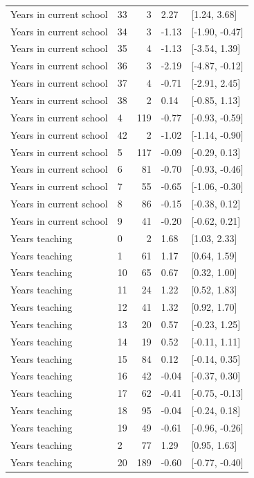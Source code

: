 \begin{tabular}{llrll}
Years in current school & 33 & 3 & 2.27 & {}[1.24, 3.68]\\
\addlinespace
Years in current school & 34 & 3 & -1.13 & {}[-1.90, -0.47]\\
Years in current school & 35 & 4 & -1.13 & {}[-3.54, 1.39]\\
Years in current school & 36 & 3 & -2.19 & {}[-4.87, -0.12]\\
Years in current school & 37 & 4 & -0.71 & {}[-2.91, 2.45]\\
Years in current school & 38 & 2 & 0.14 & {}[-0.85, 1.13]\\
\addlinespace
Years in current school & 4 & 119 & -0.77 & {}[-0.93, -0.59]\\
Years in current school & 42 & 2 & -1.02 & {}[-1.14, -0.90]\\
Years in current school & 5 & 117 & -0.09 & {}[-0.29, 0.13]\\
Years in current school & 6 & 81 & -0.70 & {}[-0.93, -0.46]\\
Years in current school & 7 & 55 & -0.65 & {}[-1.06, -0.30]\\
\addlinespace
Years in current school & 8 & 86 & -0.15 & {}[-0.38, 0.12]\\
Years in current school & 9 & 41 & -0.20 & {}[-0.62, 0.21]\\
Years teaching & 0 & 2 & 1.68 & {}[1.03, 2.33]\\
Years teaching & 1 & 61 & 1.17 & {}[0.64, 1.59]\\
Years teaching & 10 & 65 & 0.67 & {}[0.32, 1.00]\\
\addlinespace
Years teaching & 11 & 24 & 1.22 & {}[0.52, 1.83]\\
Years teaching & 12 & 41 & 1.32 & {}[0.92, 1.70]\\
Years teaching & 13 & 20 & 0.57 & {}[-0.23, 1.25]\\
Years teaching & 14 & 19 & 0.52 & {}[-0.11, 1.11]\\
Years teaching & 15 & 84 & 0.12 & {}[-0.14, 0.35]\\
\addlinespace
Years teaching & 16 & 42 & -0.04 & {}[-0.37, 0.30]\\
Years teaching & 17 & 62 & -0.41 & {}[-0.75, -0.13]\\
Years teaching & 18 & 95 & -0.04 & {}[-0.24, 0.18]\\
Years teaching & 19 & 49 & -0.61 & {}[-0.96, -0.26]\\
Years teaching & 2 & 77 & 1.29 & {}[0.95, 1.63]\\
\addlinespace
Years teaching & 20 & 189 & -0.60 & {}[-0.77, -0.40]\\

\end{tabular}
